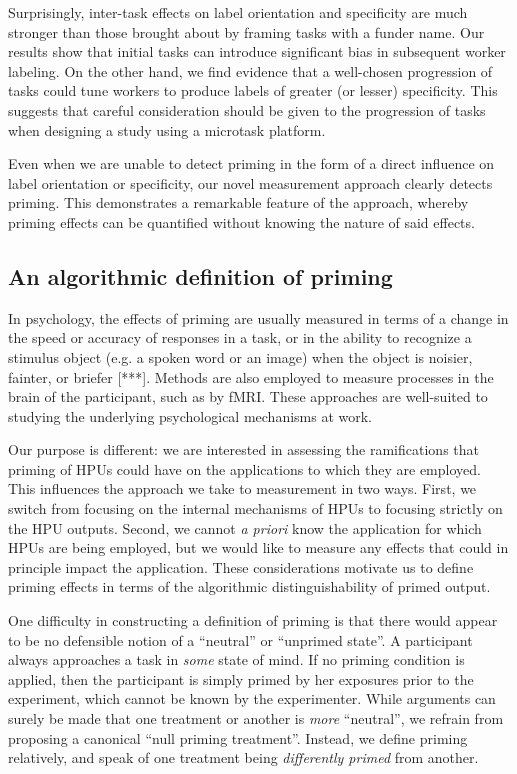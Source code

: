 \documentclass[a4paper]{report}
\begin{document}
Surprisingly, inter-task effects on label orientation and specificity are 
much stronger than those brought about by framing tasks with a funder name. 
Our results 
show that initial tasks can introduce significant bias in subsequent worker 
labeling.  On the other hand, we find evidence that a well-chosen progression 
of tasks could tune workers to produce labels of greater (or lesser) 
specificity.  This suggests that careful consideration should be given to
the progression of tasks when designing a study using a microtask platform.

Even when we are unable to detect priming in the form of a direct
influence on label orientation or specificity, our novel measurement approach 
clearly detects priming. This demonstrates a remarkable feature of the 
approach, whereby priming effects can be quantified without knowing the nature 
of said effects. 

\subsection*{An algorithmic definition of priming}

In psychology, the effects of priming are usually measured in terms of a 
change in the  
speed or accuracy of responses in a task, or in the ability to recognize a 
stimulus object (e.g. a spoken word or an image) when the object is noisier, 
fainter, or briefer [***].  Methods are also employed to measure processes
in the brain of the participant, such as by fMRI.  These approaches are 
well-suited to studying the underlying psychological mechanisms at work.

Our purpose is different: we are interested in assessing the ramifications
that priming of HPUs could have on the applications to which they are employed.
This influences the approach we take to measurement in two ways.  First, we 
switch from focusing on the internal mechanisms of HPUs to focusing strictly 
on the HPU outputs.  Second, we cannot \textit{a priori} know the 
application for which HPUs are being employed, but we would like to measure 
any effects that could in principle impact the application.  These 
considerations motivate us to define priming effects in terms of the 
algorithmic distinguishability of primed output.

One difficulty in constructing a definition of priming is that there would 
appear to be no defensible notion of a ``neutral'' or ``unprimed state''.  A 
participant 
always approaches a task in \textit{some} state of mind.  If no priming 
condition is applied, then the participant is simply primed by her
exposures prior to the experiment, which cannot be known by the experimenter.  
While arguments can surely be made that one treatment or another is 
\textit{more} 
``neutral'', we refrain from proposing a canonical ``null priming treatment''. 
Instead, we define priming relatively, and speak of one treatment being 
\textit{differently primed} from another.
\end{document}
